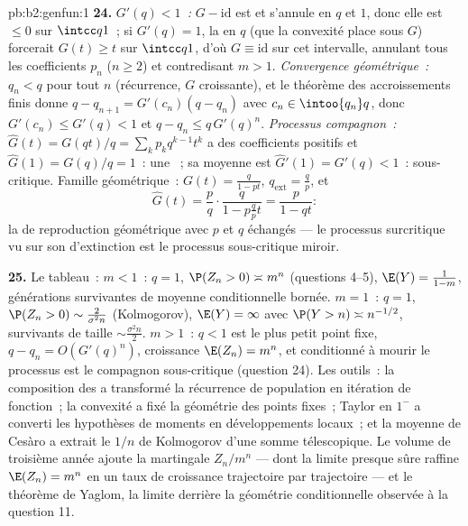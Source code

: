 \begin{solution}{pb:b2:genfun:1}
\textbf{24.} \emph{$G'(q) < 1$~:} $G - \mathrm{id}$ est 
et s'annule en $q$ et $1$, donc elle est $\leq 0$ sur $\intcc
q1$~; si $G'(q) = 1$, la  en $q$ (que la convexité
place sous $G$) forcerait $G(t) \geq t$ sur $\intcc q1$,
d'où $G \equiv \mathrm{id}$ sur cet intervalle, annulant tous les
coefficients $p_n$ ($n \geq 2$) et contredisant $m > 1$.
\emph{Convergence géométrique~:} $q_n < q$ pour tout $n$ (récurrence,
$G$ croissante), et le théorème des accroissements finis donne
$q - q_{n+1} = G'(c_n)(q - q_n)$ avec $c_n \in \intoo{q_n}q$, donc
$G'(c_n) \leq G'(q) < 1$ et $q - q_n \leq q\,G'(q)^n$.
\emph{Processus compagnon~:} $\widehat G(t) = G(qt)/q =
\sum_kp_kq^{k-1}t^k$ a des coefficients positifs et
$\widehat G(1) = G(q)/q = 1$~: une ~; sa moyenne est
$\widehat G'(1) = G'(q) < 1$~: sous-critique. Famille géométrique~:
$G(t) = \frac{q}{1-pt}$, $q_{\mathrm{ext}} = \frac qp$, et
\[
\widehat G(t) = \frac pq\cdot\frac{q}{1 - p\frac qp t}
= \frac{p}{1 - qt} :
\]
la  de reproduction géométrique avec $p$ et $q$ échangés ---
le processus surcritique vu sur son  d'extinction est le
processus sous-critique miroir.

\textbf{25.} Le tableau~: $m < 1$~: $q = 1$, $\P(Z_n > 0)
\asymp m^n$ (questions 4--5), $\E(Y) = \frac1{1-m}$,
générations survivantes de moyenne conditionnelle bornée. $m = 1$~:
$q = 1$, $\P(Z_n > 0) \sim \frac2{\sigma^2n}$ (Kolmogorov),
$\E(Y) = \infty$ avec $\P(Y > n) \asymp n^{-1/2}$, survivants
de taille $\sim \frac{\sigma^2n}2$. $m > 1$~: $q < 1$ est le
plus petit point fixe, $q - q_n = O(G'(q)^n)$, croissance $\E(Z_n) = m^n$,
et conditionné à mourir le processus est le
compagnon sous-critique (question 24). Les outils~: la composition
des  a transformé la récurrence de population en
itération de fonction~; la convexité a fixé la géométrie des points
fixes~; Taylor en $1^-$ a converti les hypothèses de moments en
développements locaux~; et la moyenne de Cesàro a extrait le $1/n$ de
Kolmogorov d'une somme télescopique. Le volume de troisième année
ajoute la martingale $Z_n/m^n$ --- dont la limite presque sûre raffine
$\E(Z_n) = m^n$ en un taux de croissance trajectoire par trajectoire
--- et le théorème de Yaglom, la  limite derrière la géométrie
conditionnelle observée à la question 11.
\end{solution}
